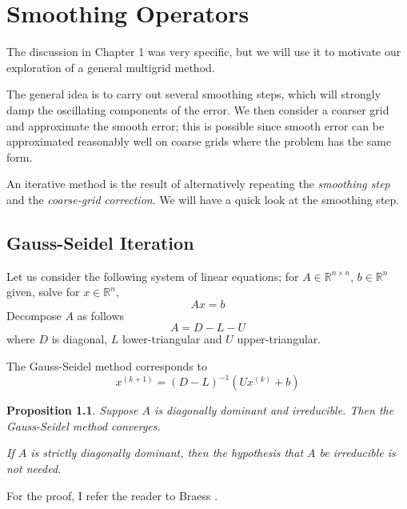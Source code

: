 \documentclass[a4paper,10pt,oneside]{book}
\theoremstyle{plain}%
\newtheorem{prop}[thm]{Proposition}
\theoremstyle{definition}
\theoremstyle{remark}
\newcommand{\bbR}{\mathbb{R}}
\begin{document}
\chapter{Smoothing Operators}

The discussion in Chapter 1 was very specific, but we will use it to motivate
our exploration of a general multigrid method.

The general idea is to carry out several smoothing steps, which will strongly
damp the oscillating components of the error. We then consider a coarser grid
and approximate the smooth error; this is possible since smooth error can
be approximated reasonably well on coarse grids where the problem has the same
form.

An iterative method is the result of alternatively repeating the
\emph{smoothing step} and the \emph{coarse-grid correction}. We will have a
quick look at the smoothing step.

\section{Gauss-Seidel Iteration}
Let us consider the following system of linear equations; for
$A\in\bbR^{n\times n}$, $b\in\bbR^n$ given, solve for $x\in\bbR^n$,
\begin{equation}
 Ax=b
\end{equation}
Decompose $A$ as follows
\begin{equation}
 A = D - L - U
\end{equation}
where $D$ is diagonal, $L$ lower-triangular and $U$ upper-triangular.

The Gauss-Seidel method corresponds to 
\begin{equation}
 x^{(k+1)} = (D-L)^{-1}\left(Ux^{(k)}+b\right)
\end{equation}

\begin{prop}
 Suppose $A$ is diagonally dominant and irreducible. Then the Gauss-Seidel
method converges.

 If $A$ is strictly diagonally dominant, then the hypothesis that $A$ be
irreducible is not needed.
\end{prop}

For the proof, I refer the reader to Braess \cite{Braess01}.
\end{document}
